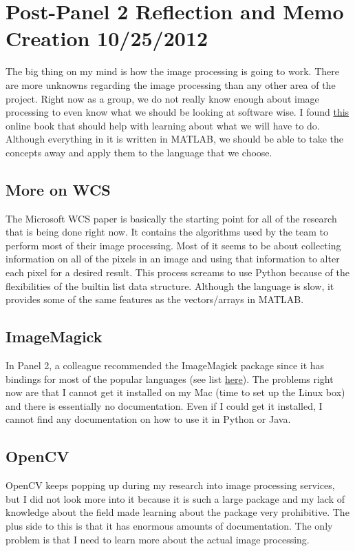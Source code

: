 \documentclass[]{article}
\begin{document}
	
	
	\section{Post-Panel 2 Reflection and Memo Creation 10/25/2012}
		The big thing on my mind is how the image processing is going to work. There are more unknowns regarding the image processing than any other area of the project. Right now as a group, we do not really know enough about image processing to even know what we should be looking at software wise. I found \href{http://en.wikibooks.org/wiki/MATLAB_Programming/Image_Processing_Toolbox}{this} online book that should help with learning about what we will have to do. Although everything in it is written in MATLAB, we should be able to take the concepts away and apply them to the language that we choose. 
		
		
		\subsection{More on WCS}
			The Microsoft WCS paper is basically the starting point for all of the research that is being done right now. It contains the algorithms used by the team to perform most of their image processing. Most of it seems to be about collecting information on all of the pixels in an image and using that information to alter each pixel for a desired result. This process screams to use Python because of the flexibilities of the builtin list data structure. Although the language is slow, it provides some of the same features as the vectors/arrays in MATLAB. 
			
		\subsection{ImageMagick}
			In Panel 2, a colleague recommended the ImageMagick package since it has bindings for most of the popular languages (see list \href{http://www.imagemagick.org/script/api.php}{here}). The problems right now are that I cannot get it installed on my Mac (time to set up the Linux box) and there is essentially no documentation. Even if I could get it installed, I cannot find any documentation on how to use it in Python or Java.
			
		\subsection{OpenCV}
			OpenCV keeps popping up during my research into image processing services, but I did not look more into it because it is such a large package and my lack of knowledge about the field made learning about the package very prohibitive. The plus side to this is that it has enormous amounts of documentation. The only problem is that I need to learn more about the actual image processing. 
			
\end{document}
